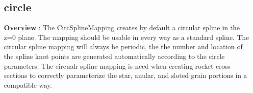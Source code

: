 \subsection{circle}

{\bf Overview} : The CircSplineMapping creates by default a circular spline in the z=0 plane.  The
           mapping should be usable in every way as a standard spline.  The circular spline mapping
           will always be periodic, the the number and location of the spline knot points are
           generated automatically according to the circle parameters.  The circualr spline mapping
           is need when creating rocket cross sections to correctly parameterize the star, anular,
           and sloted grain portions in a compatible way.


